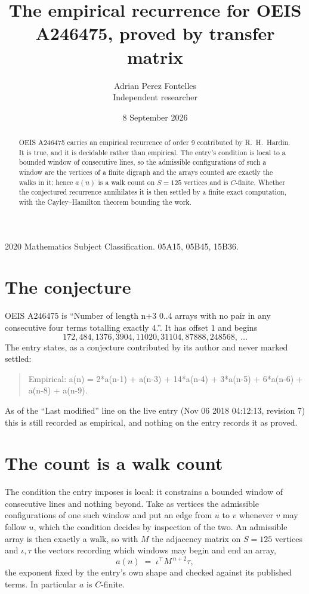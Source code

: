 \documentclass[11pt,a4paper]{article}
\title{The empirical recurrence for OEIS A246475, proved by transfer matrix}
\author{Adrian Perez Fontelles\\ \small Independent researcher}
\date{8 September 2026}
\theoremstyle{plain}
\theoremstyle{definition}
\begin{document}
\maketitle

\begin{abstract}
OEIS A246475 carries an empirical recurrence of order $9$ contributed by R.~H.~Hardin. It is
true, and it is decidable rather than empirical. The entry's condition is local to a bounded window of consecutive lines, so
the admissible configurations of such a window are the vertices of a finite digraph and the
arrays counted are exactly the walks in it; hence $a(n)$ is a walk count on $S=125$ vertices
and is $C$-finite. Whether the conjectured recurrence annihilates it is then settled by a
finite exact computation, with the Cayley--Hamilton theorem bounding the work.
\end{abstract}

\noindent\small 2020 Mathematics Subject Classification. 05A15, 05B45, 15B36.\normalsize

\section{The conjecture}

OEIS A246475 is ``Number of length n+3 0..4 arrays with no pair in any consecutive four terms totalling exactly 4.''. It has offset $1$ and begins
\[
172, 484, 1376, 3904, 11020, 31104, 87888, 248568,\ \dots
\]
The entry states, as a conjecture contributed by its author and never marked settled:
\begin{quote}
Empirical: a(n) = 2*a(n-1) + a(n-3) + 14*a(n-4) + 3*a(n-5) + 6*a(n-6) + a(n-8) + a(n-9).
\end{quote}
As of the ``Last modified'' line on the live entry (Nov 06 2018 04:12:13, revision 7) this is still
recorded as empirical, and nothing on the entry records it as proved.

\section{The count is a walk count}

The condition the entry imposes is local: it constrains a bounded window of consecutive lines and nothing beyond. Take as
vertices the admissible configurations of one such window and put an edge from $u$ to $v$
whenever $v$ may follow $u$, which the condition decides by inspection of the two. An
admissible array is then exactly a walk, so with $M$ the adjacency matrix on $S=125$ vertices
and $\iota,\tau$ the vectors recording which windows may begin and end an array,
\[
a(n)\;=\;\iota^{\!\top}M^{\,n+2}\tau ,
\]
the exponent fixed by the entry's own shape and checked against its published terms. In
particular $a$ is $C$-finite.
\end{document}
